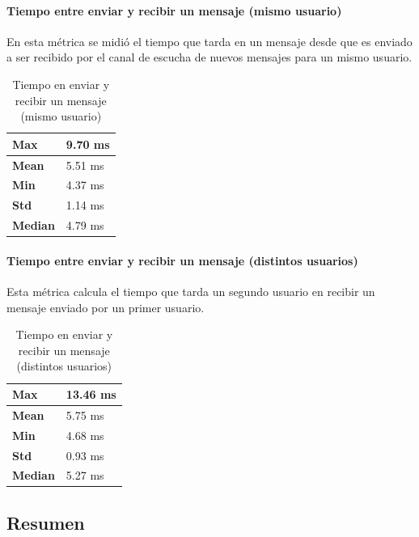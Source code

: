 \paragraph{Tiempo entre enviar y recibir un mensaje (mismo usuario)}

En esta métrica se midió el tiempo que tarda en un mensaje desde que es enviado a ser recibido por el canal de escucha de nuevos mensajes para un mismo usuario.

\setlength\tabcolsep{1pt}
\begin{table}[!htbp]
    \centering
    \begin{tabular}{|m{5em}|m{5em}|}
    \hline
    \textbf{Max} & 9.70 ms \\
    \hline
    \textbf{Mean} & 5.51 ms \\
    \hline
    \textbf{Min} & 4.37 ms \\
    \hline
    \textbf{Std} & 1.14 ms \\
    \hline
    \textbf{Median} & 4.79 ms \\
    \hline
    \end{tabular}
    \caption{Tiempo en enviar y recibir un mensaje (mismo usuario)}
\end{table}

\paragraph{Tiempo entre enviar y recibir un mensaje (distintos usuarios)}

Esta métrica calcula el tiempo que tarda un segundo usuario en recibir un mensaje enviado por un primer usuario.

\setlength\tabcolsep{1pt}
\begin{table}[!htbp]
    \centering
    \begin{tabular}{|m{5em}|m{5em}|}
    \hline
    \textbf{Max} & 13.46 ms \\
    \hline
    \textbf{Mean} & 5.75 ms \\
    \hline
    \textbf{Min} & 4.68 ms \\
    \hline
    \textbf{Std} & 0.93 ms \\
    \hline
    \textbf{Median} & 5.27 ms \\
    \hline
    \end{tabular}
    \caption{Tiempo en enviar y recibir un mensaje (distintos usuarios)}
\end{table}

\subsection{Resumen}


